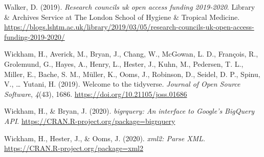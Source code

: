 \documentclass[a4paper,man,floatsintext,longtable,noextraspace,12pt]{apa6}
\newlength{\cslhangindent}
\newenvironment{cslreferences}%
  {\setlength{\parindent}{0pt}%
  \everypar{\setlength{\hangindent}{\cslhangindent}}\ignorespaces}%
  {\par}
\begin{document}
\begin{cslreferences}
\leavevmode\hypertarget{ref-walker_2019}{}%
Walker, D. (2019). \emph{Research councils uk open access funding
2019-2020}. Library \& Archives Service at The London School of Hygiene
\& Tropical Medicine.
\url{https://blogs.lshtm.ac.uk/library/2019/03/05/research-councils-uk-open-access-funding-2019-2020/}

\leavevmode\hypertarget{ref-tidyverse}{}%
Wickham, H., Averick, M., Bryan, J., Chang, W., McGowan, L. D.,
François, R., Grolemund, G., Hayes, A., Henry, L., Hester, J., Kuhn, M.,
Pedersen, T. L., Miller, E., Bache, S. M., Müller, K., Ooms, J.,
Robinson, D., Seidel, D. P., Spinu, V., \ldots{} Yutani, H. (2019).
Welcome to the tidyverse. \emph{Journal of Open Source Software},
\emph{4}(43), 1686. \url{https://doi.org/10.21105/joss.01686}

\leavevmode\hypertarget{ref-bigrquery}{}%
Wickham, H., \& Bryan, J. (2020). \emph{bigrquery: An interface to
Google's BigQuery API}.
\url{https://CRAN.R-project.org/package=bigrquery}

\leavevmode\hypertarget{ref-xml2}{}%
Wickham, H., Hester, J., \& Ooms, J. (2020). \emph{xml2: Parse XML}.
\url{https://CRAN.R-project.org/package=xml2}
\end{cslreferences}
\end{document}
